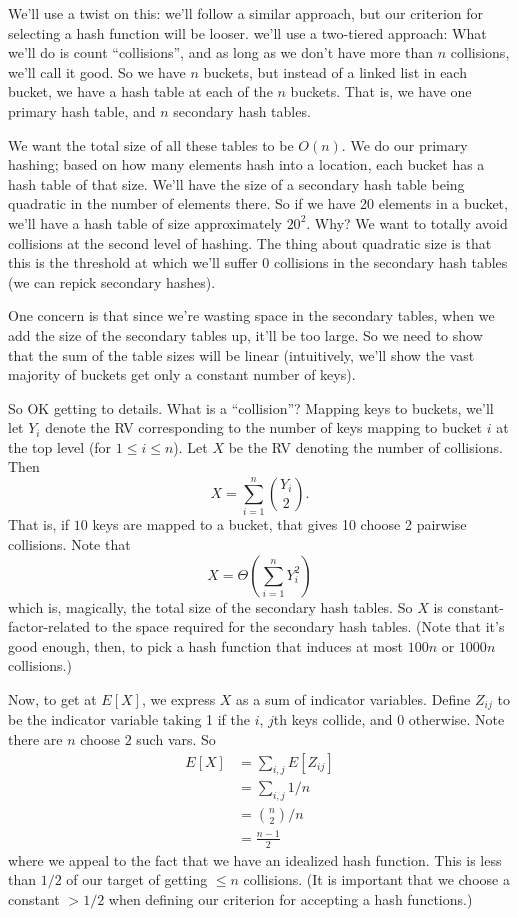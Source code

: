 \documentclass{article}
\begin{document}
We'll use a twist on this: we'll follow a similar approach, but our
criterion for selecting a hash function will be looser.
we'll use a two-tiered approach: 
What we'll do is count ``collisions'', and as long as we don't have
more than $n$ collisions, we'll call it good.
So we have $n$ buckets, but instead of a linked list in each bucket,
we have a hash table at each of the $n$ buckets.
That is, we have one primary hash table, and $n$ secondary hash tables.

We want the total size of all these tables to be $O(n)$.
We do our primary hashing; based on how many elements hash into a location,
each bucket has a hash table of that size.
We'll have the size of a secondary hash table being quadratic in the number
of elements there.
So if we have 20 elements in a bucket, we'll have a hash table of size approximately $20^2$.
Why? 
We want to totally avoid collisions at the second level of hashing.
The thing about quadratic size is that this is the threshold at which we'll
suffer 0 collisions in the secondary hash tables (we can repick secondary
hashes).

One concern is that since we're wasting space in the secondary tables,
when we add the size of the secondary tables up, it'll be too large.
So we need to show that the sum of the table sizes will be linear
(intuitively, we'll show the vast majority of buckets get only a constant number
of keys).

So OK getting to details. What is a ``collision''?
Mapping keys to buckets, we'll let $Y_i$ denote the RV corresponding
to the number of keys mapping to bucket $i$ at the top level (for $1\leq i\leq n$).
Let $X$ be the RV denoting the number of collisions.
Then
$$
X = \sum_{i=1}^n {Y_i\choose 2}.
$$
That is, if $10$ keys are mapped to a bucket, that gives 10 choose 2 pairwise
collisions.
Note that
$$
X = \Theta\left(
	\sum_{i=1}^n Y_i^2
\right)
$$
which is, magically, the total size of the secondary hash tables.
So $X$ is constant-factor-related to the space required for the secondary
hash tables.
(Note that it's good enough, then, to pick a hash function that induces
at most $100n$ or $1000n$ collisions.)

Now, to get at $E[X]$, we express $X$ as a sum of indicator variables.
Define $Z_{ij}$ to be the indicator variable taking 1 if the $i$, $j$th keys
collide, and 0 otherwise.
Note there are $n$ choose $2$ such vars.
So
\begin{align}
E[X] 
&=
\sum_{i,j} E[Z_{ij}]  \\
&=
\sum_{i,j} 1/n \\
&=
{n \choose 2} / n
\\
&= 
\frac{n-1}{2}
\end{align}
where we appeal to the fact that we have an idealized hash function.
This is less than $1/2$ of our target of getting $\leq n$ collisions.
(It is important that we choose a constant $> 1/2$ when defining
our criterion for accepting a hash functions.)
\end{document}
